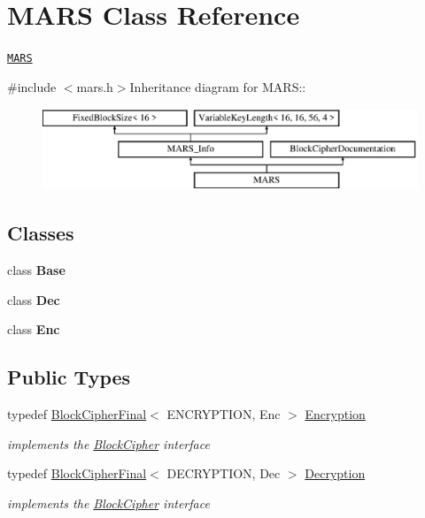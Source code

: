 \hypertarget{class_m_a_r_s}{
\section{MARS Class Reference}
\label{class_m_a_r_s}
}


\href{http://www.weidai.com/scan-mirror/cs.html#MARS}{\tt MARS}  


{\ttfamily \#include $<$mars.h$>$}Inheritance diagram for MARS::\begin{figure}[H]
\begin{center}
\leavevmode
\includegraphics[height=2.45614cm]{class_m_a_r_s}
\end{center}
\end{figure}
\subsection*{Classes}
\begin{DoxyCompactItemize}
\item 
class {\bfseries Base}
\item 
class {\bfseries Dec}
\item 
class {\bfseries Enc}
\end{DoxyCompactItemize}
\subsection*{Public Types}
\begin{DoxyCompactItemize}
\item 
\hypertarget{class_m_a_r_s_a2ad5c611d110195885a9439e2367ad61}{
typedef \hyperlink{class_block_cipher_final}{BlockCipherFinal}$<$ ENCRYPTION, Enc $>$ \hyperlink{class_m_a_r_s_a2ad5c611d110195885a9439e2367ad61}{Encryption}}
\label{class_m_a_r_s_a2ad5c611d110195885a9439e2367ad61}

\begin{DoxyCompactList}\small\item\em implements the \hyperlink{class_block_cipher}{BlockCipher} interface \item\end{DoxyCompactList}\item 
\hypertarget{class_m_a_r_s_a22a34e3477f29d9d263de092801c6ee7}{
typedef \hyperlink{class_block_cipher_final}{BlockCipherFinal}$<$ DECRYPTION, Dec $>$ \hyperlink{class_m_a_r_s_a22a34e3477f29d9d263de092801c6ee7}{Decryption}}
\label{class_m_a_r_s_a22a34e3477f29d9d263de092801c6ee7}

\begin{DoxyCompactList}\small\item\em implements the \hyperlink{class_block_cipher}{BlockCipher} interface \item\end{DoxyCompactList}\end{DoxyCompactItemize}


